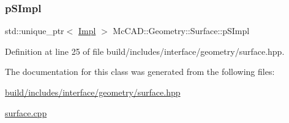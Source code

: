 \subsubsection{\texorpdfstring{p\+S\+Impl}{pSImpl}}
{\footnotesize\ttfamily std\+::unique\+\_\+ptr$<$ \hyperlink{classMcCAD_1_1Geometry_1_1Surface_1_1Impl}{Impl} $>$ Mc\+C\+A\+D\+::\+Geometry\+::\+Surface\+::p\+S\+Impl\hspace{0.3cm}{\ttfamily [private]}}



Definition at line 25 of file build/includes/interface/geometry/surface.\+hpp.



The documentation for this class was generated from the following files\+:\begin{DoxyCompactItemize}
\item 
\hyperlink{build_2includes_2interface_2geometry_2surface_8hpp}{build/includes/interface/geometry/surface.\+hpp}\item 
\hyperlink{surface_8cpp}{surface.\+cpp}\end{DoxyCompactItemize}
